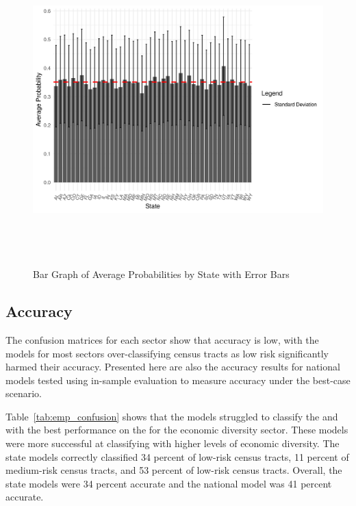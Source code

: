 \begin{figure}[htbp]
    \centering
     \includegraphics[width=1\textwidth, height=12cm]{plots/prob_state.png}
     \caption{Bar Graph of Average Probabilities by State with Error Bars}
     \label{fig:prob_sector}
 \end{figure}


\subsection{Accuracy}
The confusion matrices for each sector show that accuracy is low, with the models for most sectors over-classifying census tracts as low risk significantly harmed their accuracy. Presented here are also the accuracy results for national models tested using in-sample evaluation to measure accuracy under the best-case scenario. 

Table~\ref{tab:emp_confusion} shows that the models struggled to classify the \mrls and \hrls with the best performance on the \lrls for the economic diversity sector. These models were more successful at classifying \cts with higher levels of economic diversity. The state models correctly classified 34 percent of low-risk census tracts, 11 percent of medium-risk census tracts, and 53 percent of low-risk census tracts. Overall, the state models were 34 percent accurate and the national model was 41 percent accurate. 

 


